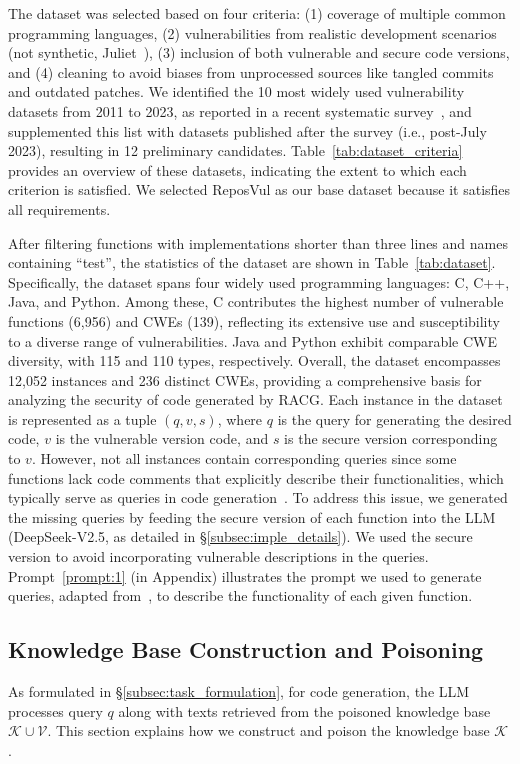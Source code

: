 The dataset was selected based on four criteria: (1) coverage of multiple common programming languages, (2) vulnerabilities from realistic development scenarios (not synthetic, \eg Juliet~\cite{boland2012juliet}), (3) inclusion of both vulnerable and secure code versions, and (4) cleaning to avoid biases from unprocessed sources like tangled commits and outdated patches.
We identified the 10 most widely used vulnerability datasets from 2011 to 2023, as reported in a recent systematic survey~\cite{shiri2024systematic}, and supplemented this list with datasets published after the survey (i.e., post-July 2023), resulting in 12 preliminary candidates. Table~\ref{tab:dataset_criteria} provides an overview of these datasets, indicating the extent to which each criterion is satisfied. We selected ReposVul as our base dataset because it satisfies all requirements.

After filtering functions with implementations shorter than three lines and names containing ``test'', the statistics of the dataset are shown in Table~\ref{tab:dataset}. Specifically, the dataset spans four widely used programming languages: C, C++, Java, and Python. Among these, C contributes the highest number of vulnerable functions (6,956) and CWEs (139), reflecting its extensive use and susceptibility to a diverse range of vulnerabilities. Java and Python exhibit comparable CWE diversity, with 115 and 110 types, respectively. Overall, the dataset encompasses 12,052 instances and 236 distinct CWEs, providing a comprehensive basis for analyzing the security of code generated by RACG. Each instance in the dataset is represented as a tuple $(q, v, s)$, where $q$ is the query for generating the desired code, $v$ is the vulnerable version code, and $s$ is the secure version corresponding to $v$. However, not all instances contain corresponding queries since some functions lack code comments that explicitly describe their functionalities, which typically serve as queries in code generation~\cite{husain2019codesearchnet}. 
To address this issue, we generated the missing queries by feeding the secure version of each function into the LLM (\ie DeepSeek-V2.5, as detailed in \S\ref{subsec:imple_details}). We used the secure version to avoid incorporating vulnerable descriptions in the queries.
Prompt~\ref{prompt:1} (in Appendix) illustrates the prompt we used to generate queries, adapted from~\cite{geng2024large}, to describe the functionality of each given function.


\subsection{Knowledge Base Construction and Poisoning}
\label{subsec:kn_construct}
As formulated in \S\ref{subsec:task_formulation}, for code generation, the LLM processes query $q$ along with
texts retrieved from the poisoned knowledge base $\mathcal{K} \cup \mathcal{V}$. This section explains how we construct and poison the knowledge base $\mathcal{K}$.

